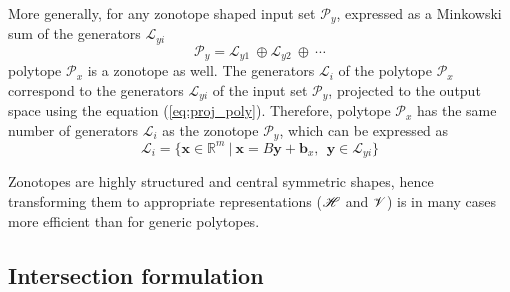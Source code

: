 More generally, for any zonotope shaped input set $\mathcal{P}_y$, expressed as a Minkowski sum of the generators $\mathcal{L}_{yi}$
\begin{equation}
    \mathcal{P}_y = \mathcal{L}_{y1}  ~\oplus \mathcal{L}_{y2}~\oplus~ \cdots
\end{equation}
polytope $\mathcal{P}_x$ is a zonotope as well. The generators $\mathcal{L}_i$ of the polytope $\mathcal{P}_x$ correspond to the generators $\mathcal{L}_{yi}$ of the input set $\mathcal{P}_y$, projected to the output space using the equation (\ref{eq:proj_poly}). Therefore, polytope $\mathcal{P}_x$ has the same number of generators $\mathcal{L}_i$ as the zonotope $\mathcal{P}_y$, which can be expressed as
\begin{equation}
    \mathcal{L}_i = \{\bm{x}\in\mathbb{R}^m ~|~ \bm{x} = B\bm{y} + \bm{b}_x,~~ \bm{y}\in  \mathcal{L}_{yi}\}
\end{equation}

Zonotopes are highly structured and central symmetric shapes, hence transforming them to appropriate representations ($\mathscr{H}$ and $\mathscr{V}$) is in many cases more efficient than for generic polytopes.


\subsection{Intersection formulation}
\label{ch:inter_formulaiton}

